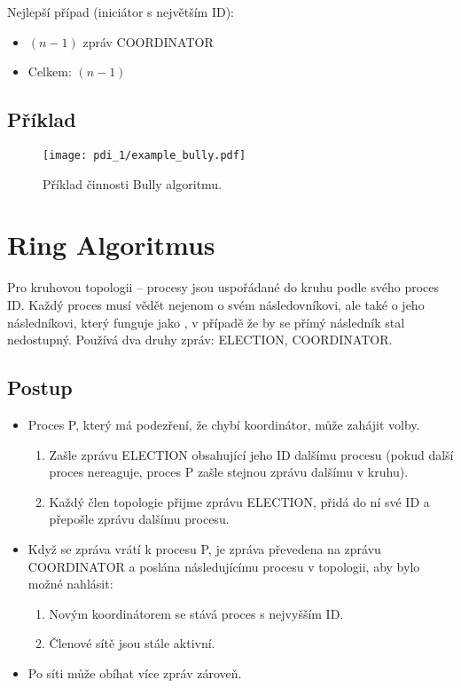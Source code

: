 \noindent Nejlepší případ (iniciátor s největším ID):

\begin{itemize}
    \item $(n-1)$ zpráv COORDINATOR
    \item Celkem: $(n-1)$
\end{itemize}

\subsection*{Příklad}

\begin{figure}[H]
    \centering
    \texttt{[image: pdi\_1/example\_bully.pdf]}
    \caption{Příklad činnosti Bully algoritmu.}
\end{figure}


\section{Ring Algoritmus}

Pro kruhovou topologii -- procesy jsou uspořádané do kruhu podle svého proces ID.
Každý proces musí vědět nejenom o svém následovníkovi, ale také o jeho následníkovi, který funguje jako , v případě že by se přímý následník stal nedostupný. Používá dva druhy zpráv: ELECTION, COORDINATOR.

\subsection*{Postup}

\begin{itemize}
    \item Proces P, který má podezření, že chybí koordinátor, může zahájit volby.
    \begin{enumerate}
        \item Zašle zprávu ELECTION obsahující jeho ID dalšímu procesu (pokud další proces nereaguje, proces P zašle stejnou zprávu dalšímu v kruhu).
        \item Každý člen topologie přijme zprávu ELECTION, přidá do ní své ID a přepošle zprávu dalšímu procesu.
    \end{enumerate}
    \item Když se zpráva vrátí k procesu P, je zpráva převedena na zprávu  COORDINATOR a poslána následujícímu procesu v topologii, aby bylo možné nahlásit:
    \begin{enumerate}
        \item Novým koordinátorem se stává proces s nejvyšším ID.
        \item Členové sítě jsou stále aktivní.
    \end{enumerate}
    \item Po síti může obíhat více zpráv zároveň.
\end{itemize}

